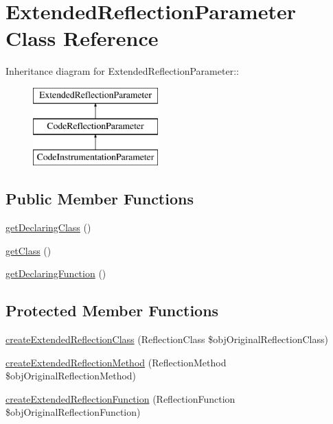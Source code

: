 \hypertarget{class_extended_reflection_parameter}{
\section{ExtendedReflectionParameter Class Reference}
\label{class_extended_reflection_parameter}
}
Inheritance diagram for ExtendedReflectionParameter::\begin{figure}[H]
\begin{center}
\leavevmode
\includegraphics[height=3cm]{class_extended_reflection_parameter}
\end{center}
\end{figure}
\subsection*{Public Member Functions}
\begin{CompactItemize}
\item 
\hyperlink{class_extended_reflection_parameter_72292163fccd8a81a83af04f371e795a}{getDeclaringClass} ()
\item 
\hyperlink{class_extended_reflection_parameter_9aaaf60b00d1c1cde3c86cda51402461}{getClass} ()
\item 
\hyperlink{class_extended_reflection_parameter_0bc8d76223b0770a40a3ab909cc5b3f0}{getDeclaringFunction} ()
\end{CompactItemize}
\subsection*{Protected Member Functions}
\begin{CompactItemize}
\item 
\hyperlink{class_extended_reflection_parameter_7119682d1601c3398cbad195a4d52b4a}{createExtendedReflectionClass} (ReflectionClass \$objOriginalReflectionClass)
\item 
\hyperlink{class_extended_reflection_parameter_fc7cab8ac6553754c4c4c62ba8be8685}{createExtendedReflectionMethod} (ReflectionMethod \$objOriginalReflectionMethod)
\item 
\hyperlink{class_extended_reflection_parameter_8bea4c5548f8e5476b28c37b705dc25e}{createExtendedReflectionFunction} (ReflectionFunction \$objOriginalReflectionFunction)
\end{CompactItemize}


